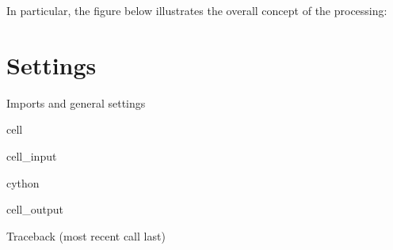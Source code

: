 \documentclass[letterpaper,10pt,english]{jupyterBook}
\begin{document}
\sphinxAtStartPar
In particular, the figure below illustrates the overall concept of the processing:



\section{Settings}
\label{\detokenize{CIMR_L2_Sea_Ice_Drift_performanceAssessment:settings}}
\sphinxAtStartPar
Imports and general settings

\begin{sphinxuseclass}{cell}\begin{sphinxVerbatimInput}

\begin{sphinxuseclass}{cell_input}
\begin{sphinxVerbatim}[commandchars=\\\{\}]
 cython
\end{sphinxVerbatim}

\end{sphinxuseclass}\end{sphinxVerbatimInput}
\begin{sphinxVerbatimOutput}

\begin{sphinxuseclass}{cell_output}
\begin{sphinxVerbatim}[commandchars=\\\{\}]
Traceback (most recent call last)
 \PYG{p}{[}\PYG{p}{]}  
  


\end{sphinxVerbatim}
\end{sphinxuseclass}
\end{sphinxVerbatimOutput}
\end{sphinxuseclass}
\end{document}

